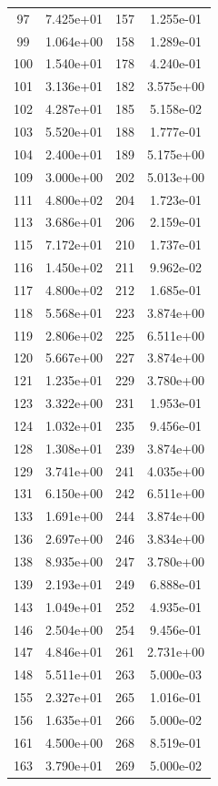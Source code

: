 \documentclass[12pt]{article}
\begin{document}
\begin{longtable}{@{}cccc@{}}
97 & 7.425e+01 & 157 & 1.255e-01 \\
99 & 1.064e+00 & 158 & 1.289e-01 \\
100 & 1.540e+01 & 178 & 4.240e-01 \\
101 & 3.136e+01 & 182 & 3.575e+00 \\
102 & 4.287e+01 & 185 & 5.158e-02 \\
103 & 5.520e+01 & 188 & 1.777e-01 \\
104 & 2.400e+01 & 189 & 5.175e+00 \\
109 & 3.000e+00 & 202 & 5.013e+00 \\
111 & 4.800e+02 & 204 & 1.723e-01 \\
113 & 3.686e+01 & 206 & 2.159e-01 \\
115 & 7.172e+01 & 210 & 1.737e-01 \\
116 & 1.450e+02 & 211 & 9.962e-02 \\
117 & 4.800e+02 & 212 & 1.685e-01 \\
118 & 5.568e+01 & 223 & 3.874e+00 \\
119 & 2.806e+02 & 225 & 6.511e+00 \\
120 & 5.667e+00 & 227 & 3.874e+00 \\
121 & 1.235e+01 & 229 & 3.780e+00 \\
123 & 3.322e+00 & 231 & 1.953e-01 \\
124 & 1.032e+01 & 235 & 9.456e-01 \\
128 & 1.308e+01 & 239 & 3.874e+00 \\
129 & 3.741e+00 & 241 & 4.035e+00 \\
131 & 6.150e+00 & 242 & 6.511e+00 \\
133 & 1.691e+00 & 244 & 3.874e+00 \\
136 & 2.697e+00 & 246 & 3.834e+00 \\
138 & 8.935e+00 & 247 & 3.780e+00 \\
139 & 2.193e+01 & 249 & 6.888e-01 \\
143 & 1.049e+01 & 252 & 4.935e-01 \\
146 & 2.504e+00 & 254 & 9.456e-01 \\
147 & 4.846e+01 & 261 & 2.731e+00 \\
148 & 5.511e+01 & 263 & 5.000e-03 \\
155 & 2.327e+01 & 265 & 1.016e-01 \\
156 & 1.635e+01 & 266 & 5.000e-02 \\
161 & 4.500e+00 & 268 & 8.519e-01 \\
163 & 3.790e+01 & 269 & 5.000e-02 \\

\end{longtable}
\end{document}
